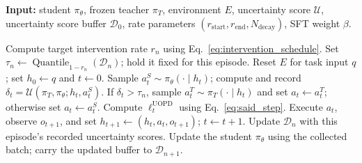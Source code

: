 \begin{algorithm}[t]
\caption{UOPD}
\label{alg:said}
{\bfseries Input:} student $\pi_\theta$, frozen teacher $\pi_T$, environment $E$, uncertainty score $\mathcal U$, uncertainty score buffer $\mathcal D_0$, rate parameters $(r_{\mathrm{start}},r_{\mathrm{end}},N_{\mathrm{decay}})$, SFT weight $\beta$.
\begin{algorithmic}[1]
  \STATE Compute target intervention rate $r_n$ using Eq.~\ref{eq:intervention_schedule}.
    \STATE Set $\tau_n\gets\operatorname{Quantile}_{1-r_n}(\mathcal D_n)$; hold it fixed for this episode.
    \STATE Reset $E$ for task input $q$; set $h_0\gets q$ and $t\gets0$.
      \STATE Sample $a_t^S\sim\pi_\theta(\cdot\mid h_t)$; compute and record $\delta_t=\mathcal U(\pi_T,\pi_\theta;h_t,a_t^S)$.
      \STATE If $\delta_t>\tau_n$, sample $a_t^T\sim\pi_T(\cdot\mid h_t)$ and set $a_t\gets a_t^T$; otherwise set $a_t\gets a_t^S$.
      \STATE Compute $\ell_t^{\mathrm{UOPD}}$ using Eq.~\ref{eq:said_step}.
      \STATE Execute $a_t$, observe $o_{t+1}$, and set $h_{t+1}\gets(h_t,a_t,o_{t+1})$; $t\gets t+1$.
    \ENDWHILE
    \STATE Update $\mathcal D_n$ with this episode's recorded uncertainty scores.
  \ENDFOR
  \STATE Update the student $\pi_\theta$ using the collected batch; carry the updated buffer to $\mathcal D_{n+1}$.
\ENDFOR
\end{algorithmic}
\end{algorithm}

